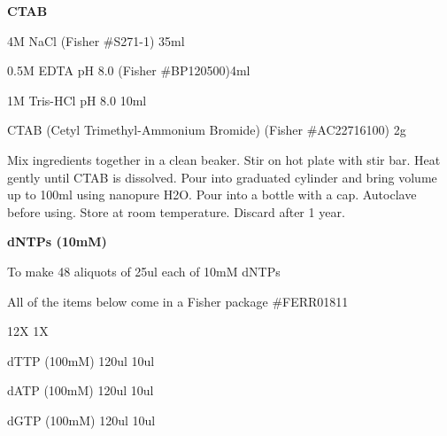 \documentclass[11pt, oneside]{article}
\begin{document}
	\newpage

		{\bf CTAB}									

			\hspace{2mm}4M NaCl \hspace{67mm}(Fisher \#S271-1)	\hspace{12mm}	35ml

			\hspace{2mm}0.5M EDTA pH 8.0 \hspace{49mm}(Fisher \#BP120500)\hspace{9mm}4ml

			\hspace{2mm}1M Tris-HCl pH 8.0\hspace{92mm} 10ml

			\hspace{2mm}CTAB (Cetyl Trimethyl-Ammonium Bromide)\hspace{5mm}	(Fisher \#AC22716100)	\hspace{2mm} 2g

			\noindent*Mix ingredients together in a clean beaker. Stir on hot plate with stir bar. Heat gently until CTAB is dissolved. Pour into 				graduated cylinder and bring volume up to 100ml using nanopure H2O. Pour into a bottle with a cap. Autoclave before using. Store at room 			temperature. Discard after 1 year. 

		\vspace{5mm}

		{\bf dNTPs (10mM)}

			\hspace{2mm}To make 48 aliquots of 25ul each of 10mM dNTPs

			\hspace{2mm}All of the items below come in a Fisher package \#FERR01811

			\hspace{40mm}			12X	 \hspace{5mm}	1X
			
			\hspace{2mm}dTTP (100mM)	\hspace{9mm} 120ul	\hspace{5mm}	10ul

			\hspace{2mm}dATP (100mM)	\hspace{9mm} 120ul	\hspace{5mm}	10ul

			\hspace{2mm}dGTP (100mM)	\hspace{9mm} 120ul	\hspace{5mm}	10ul
\end{document}
